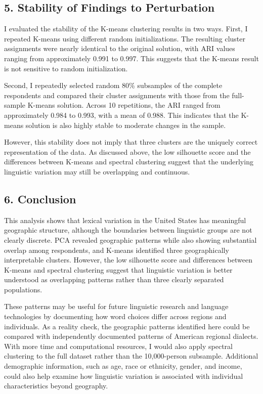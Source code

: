 \documentclass[
]{article}
\begin{document}
\subsection{5. Stability of Findings to
Perturbation}\label{stability-of-findings-to-perturbation}

I evaluated the stability of the K-means clustering results in two ways.
First, I repeated K-means using different random initializations. The
resulting cluster assignments were nearly identical to the original
solution, with ARI values ranging from approximately 0.991 to 0.997.
This suggests that the K-means result is not sensitive to random
initialization.

Second, I repeatedly selected random 80\% subsamples of the complete
respondents and compared their cluster assignments with those from the
full-sample K-means solution. Across 10 repetitions, the ARI ranged from
approximately 0.984 to 0.993, with a mean of 0.988. This indicates that
the K-means solution is also highly stable to moderate changes in the
sample.

However, this stability does not imply that three clusters are the
uniquely correct representation of the data. As discussed above, the low
silhouette score and the differences between K-means and spectral
clustering suggest that the underlying linguistic variation may still be
overlapping and continuous.

\subsection{6. Conclusion}\label{conclusion}

This analysis shows that lexical variation in the United States has
meaningful geographic structure, although the boundaries between
linguistic groups are not clearly discrete. PCA revealed geographic
patterns while also showing substantial overlap among respondents, and
K-means identified three geographically interpretable clusters. However,
the low silhouette score and differences between K-means and spectral
clustering suggest that linguistic variation is better understood as
overlapping patterns rather than three clearly separated populations.

These patterns may be useful for future linguistic research and language
technologies by documenting how word choices differ across regions and
individuals. As a reality check, the geographic patterns identified here
could be compared with independently documented patterns of American
regional dialects. With more time and computational resources, I would
also apply spectral clustering to the full dataset rather than the
10,000-person subsample. Additional demographic information, such as
age, race or ethnicity, gender, and income, could also help examine how
linguistic variation is associated with individual characteristics
beyond geography.
\end{document}
